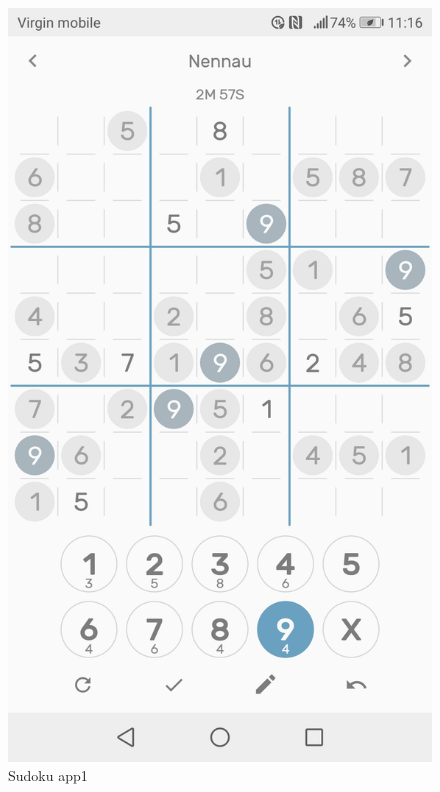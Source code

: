 \documentclass[a4paper,twoside,12pt]{book}
\begin{document}

\begin{figure}[H]
\centering
\begin{minipage}{.5\textwidth}
  \centering
  \includegraphics[width=.8\linewidth]{sudoku.jpg}
  \caption{Sudoku app1}
  \label{fig:Sudoku app1}
\end{minipage}%
\begin{minipage}{.5\textwidth}
  \centering

\end{minipage}
\end{figure}
\end{document}
